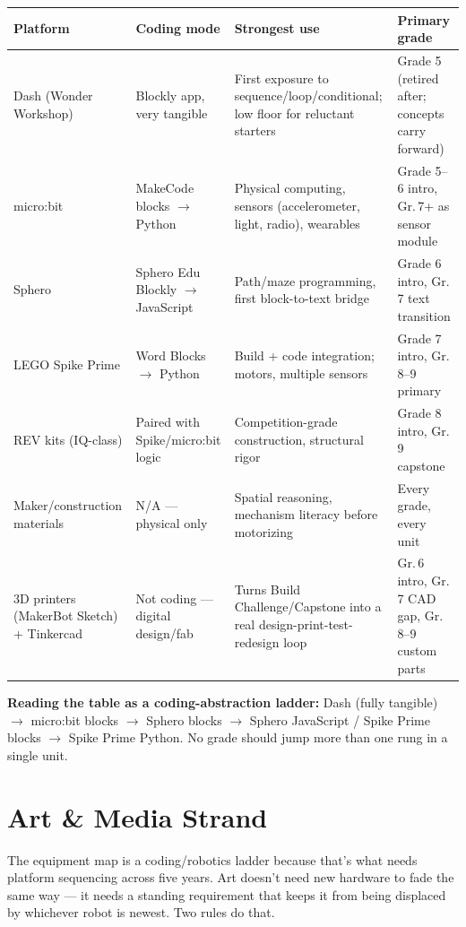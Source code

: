 \documentclass[10pt, a4paper]{article}
\begin{document}
\begin{center}
\small
\begin{tabularx}{\linewidth}{@{}p{2.7cm}p{2.4cm}Xp{2.1cm}@{}}
\toprule
\textbf{Platform} & \textbf{Coding mode} & \textbf{Strongest use} & \textbf{Primary grade} \\
\midrule
Dash (Wonder Workshop) & Blockly app, very tangible & First exposure to sequence/loop/conditional; low floor for reluctant starters & Grade 5 (retired after; concepts carry forward) \\
micro:bit & MakeCode blocks $\rightarrow$ Python & Physical computing, sensors (accelerometer, light, radio), wearables & Grade 5--6 intro, Gr.\,7+ as sensor module \\
Sphero & Sphero Edu Blockly $\rightarrow$ JavaScript & Path/maze programming, first block-to-text bridge & Grade 6 intro, Gr.\,7 text transition \\
LEGO Spike Prime & Word Blocks $\rightarrow$ Python & Build + code integration; motors, multiple sensors & Grade 7 intro, Gr.\,8--9 primary \\
REV kits (IQ-class) & Paired with Spike/micro:bit logic & Competition-grade construction, structural rigor & Grade 8 intro, Gr.\,9 capstone \\
Maker/construction materials & N/A --- physical only & Spatial reasoning, mechanism literacy before motorizing & Every grade, every unit \\
3D printers (MakerBot Sketch) + Tinkercad & Not coding --- digital design/fab & Turns Build Challenge/Capstone into a real design-print-test-redesign loop & Gr.\,6 intro, Gr.\,7 CAD gap, Gr.\,8--9 custom parts \\
\bottomrule
\end{tabularx}
\end{center}

\noindent\textbf{Reading the table as a coding-abstraction ladder:} Dash (fully tangible) $\rightarrow$ micro:bit blocks $\rightarrow$ Sphero blocks $\rightarrow$ Sphero JavaScript / Spike Prime blocks $\rightarrow$ Spike Prime Python. No grade should jump more than one rung in a single unit.

\section{Art \& Media Strand}

The equipment map is a coding/robotics ladder because that's what needs platform sequencing across five years. Art doesn't need new hardware to fade the same way --- it needs a standing requirement that keeps it from being displaced by whichever robot is newest. Two rules do that.
\end{document}
